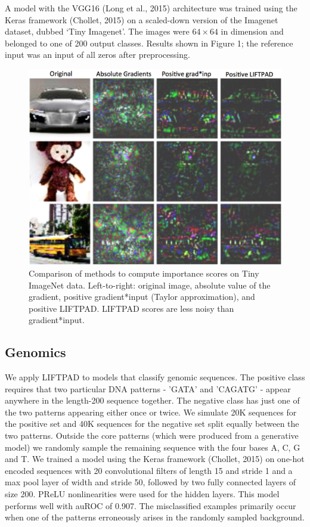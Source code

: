 \documentclass{article}
\begin{document}
A model with the VGG16 (Long et al., 2015) architecture was trained using the Keras framework (Chollet, 2015) on a scaled-down version of the Imagenet dataset, dubbed `Tiny Imagenet'. The images were $64 \times 64$ in dimension and belonged to one of 200 output classes. Results shown in Figure 1; the reference input was an input of all zeros after preprocessing.
\begin{figure}[!ht]
\begin{center}
\includegraphics[scale=0.4]{TinyImagenetLIFTPAD.png}
\caption{Comparison of methods to compute importance scores on Tiny ImageNet data. Left-to-right: original image, absolute value of the gradient, positive gradient*input (Taylor approximation), and positive LIFTPAD. LIFTPAD scores are less noisy than gradient*input.}
\end{center}
\end{figure}
\subsection{Genomics}
We apply LIFTPAD to models that classify genomic sequences. The positive class requires that two particular DNA patterns - 'GATA' and 'CAGATG' - appear anywhere in the length-200 sequence together. The negative class has just one of the two patterns appearing either once or twice. We simulate 20K sequences for the positive set and 40K sequences for the negative set split equally between the two patterns. Outside the core patterns (which were produced from a generative model) we randomly sample the remaining sequence with the four bases A, C, G and T. We trained a model using the Keras framework (Chollet, 2015) on one-hot encoded sequences with 20 convolutional filters of length 15 and stride 1 and a max pool layer of width and stride 50, followed by two fully connected layers of size 200. PReLU nonlinearities were used for the hidden layers. This model performs well with auROC of 0.907. The misclassified examples primarily occur when one of the patterns erroneously arises in the randomly sampled background. %
\end{document}
